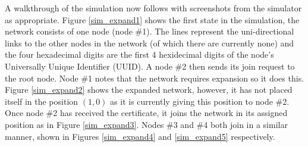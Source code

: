 \documentclass[ %
                    author={Luke Murray},
                supervisor={Dr. Simon Hollis},
                     title={Shadow Peer-to-Peer Networks},
                  subtitle={},
                    degree={MEng},
                      year={2013} ]{thesis}
\begin{document}
A walkthrough of the simulation now follows with screenshots from the simulator as appropriate. Figure \ref{sim_expand1} shows the first state in the simulation, the network consists of one node (node \#1). The lines represent the uni-directional links to the other nodes in the network (of which there are currently none) and the four hexadecimal digits are the first 4 hexidecimal digits of the node's Universally Unique Identifier (UUID). A node \#2 then sends its join request to the root node. Node \#1 notes that the network requires expansion so it does this. Figure \ref{sim_expand2} shows the expanded network, however, it has not placed itself in the position $(1,0)$ as it is currently giving this position to node \#2. Once node \#2 has received the certificate, it joins the network in its assigned position as in Figure \ref{sim_expand3}. Nodes \#3 and \#4 both join in a similar manner, shown in Figures \ref{sim_expand4} and \ref{sim_expand5} respectively.
\end{document}
